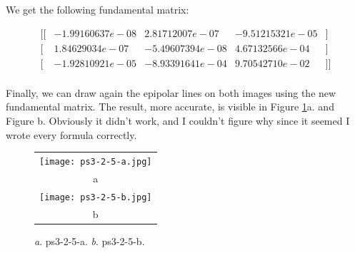 \documentclass[a4paper,11pt]{article}
\begin{document}
We get the following fundamental matrix:

$$
\begin{matrix}
[ [ &-1.99160637e-08  &2.81712007e-07  & -9.51215321e-05& ]\\
 [ &1.84629034e-07 & -5.49607394e-08 &  4.67132566e-04 &]\\
 [ &-1.92810921e-05  & -8.93391641e-04  & 9.70542710e-02&]] \\
\end{matrix}
$$

Finally, we can draw again the epipolar lines on both images using the new fundamental matrix.
The result, more accurate, is visible in Figure \ref{ps3-2-5}a. and Figure b.
Obviously it didn't work, and I couldn't figure why since it seemed I wrote every formula correctly.

 \begin{figure}[H]
\begin{center}
\begin{tabular}{c}
	\texttt{[image: ps3-2-5-a.jpg]}\\
	a\\
	\texttt{[image: ps3-2-5-b.jpg]}\\
	b
\end{tabular}
\end{center}
\caption{ 
\textit{a}. ps3-2-5-a.  \textit{b}. ps3-2-5-b. }
\label{ps3-2-5}
\end{figure}
\end{document}

